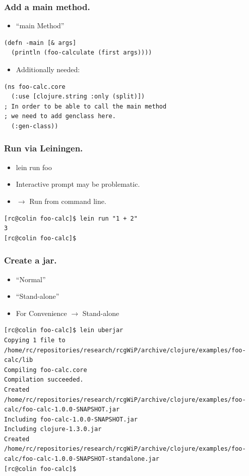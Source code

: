 \documentclass{beamer}
\begin{document}
\begin{frame}[fragile]
\frametitle{Add a main method.}
\begin{itemize}
\item ``main Method''
\end{itemize}
\begin{lstlisting}[basicstyle=\scriptsize]
(defn -main [& args]
  (println (foo-calculate (first args))))
\end{lstlisting}
\begin{itemize}
\item Additionally needed:
\end{itemize}
\begin{lstlisting}[basicstyle=\scriptsize]
(ns foo-calc.core
  (:use [clojure.string :only (split)])
; In order to be able to call the main method
; we need to add genclass here.
  (:gen-class))
\end{lstlisting}
\end{frame}

\begin{frame}[fragile]
\frametitle{Run via Leiningen.}
\begin{itemize}
\item lein run foo
\item Interactive prompt may be problematic.
\item $\rightarrow$ Run from command line.
\end{itemize}
\begin{lstlisting}[basicstyle=\scriptsize]
[rc@colin foo-calc]$ lein run "1 + 2" 
3
[rc@colin foo-calc]$ 
\end{lstlisting}
\end{frame}

\begin{frame}[fragile]
\frametitle{Create a jar.}
\begin{itemize}
\item ``Normal''
\item ``Stand-alone''
\item For Convenience $\rightarrow$ Stand-alone
\end{itemize}
\begin{lstlisting}[basicstyle=\scriptsize]
[rc@colin foo-calc]$ lein uberjar 
Copying 1 file to /home/rc/repositories/research/rcgWiP/archive/clojure/examples/foo-calc/lib
Compiling foo-calc.core
Compilation succeeded.
Created /home/rc/repositories/research/rcgWiP/archive/clojure/examples/foo-calc/foo-calc-1.0.0-SNAPSHOT.jar
Including foo-calc-1.0.0-SNAPSHOT.jar
Including clojure-1.3.0.jar
Created /home/rc/repositories/research/rcgWiP/archive/clojure/examples/foo-calc/foo-calc-1.0.0-SNAPSHOT-standalone.jar
[rc@colin foo-calc]$  
\end{lstlisting}
\end{frame}
\end{document}
